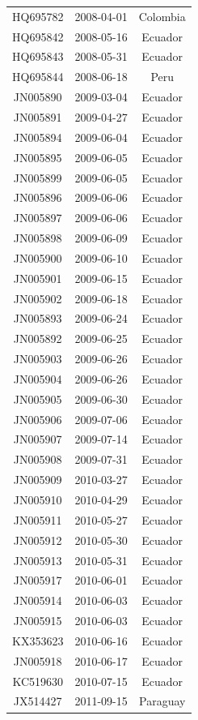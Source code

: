 \documentclass[a4paper,10pt]{article}
\begin{document}
\begin{center}
\begin{longtable}{ccc}
HQ695782 & 2008-04-01 & Colombia \\
HQ695842 & 2008-05-16 & Ecuador \\
HQ695843 & 2008-05-31 & Ecuador \\
HQ695844 & 2008-06-18 & Peru \\
JN005890 & 2009-03-04 & Ecuador \\
JN005891 & 2009-04-27 & Ecuador \\
JN005894 & 2009-06-04 & Ecuador \\
JN005895 & 2009-06-05 & Ecuador \\
JN005899 & 2009-06-05 & Ecuador \\
JN005896 & 2009-06-06 & Ecuador \\
JN005897 & 2009-06-06 & Ecuador \\
JN005898 & 2009-06-09 & Ecuador \\
JN005900 & 2009-06-10 & Ecuador \\
JN005901 & 2009-06-15 & Ecuador \\
JN005902 & 2009-06-18 & Ecuador \\
JN005893 & 2009-06-24 & Ecuador \\
JN005892 & 2009-06-25 & Ecuador \\
JN005903 & 2009-06-26 & Ecuador \\
JN005904 & 2009-06-26 & Ecuador \\
JN005905 & 2009-06-30 & Ecuador \\
JN005906 & 2009-07-06 & Ecuador \\
JN005907 & 2009-07-14 & Ecuador \\
JN005908 & 2009-07-31 & Ecuador \\
JN005909 & 2010-03-27 & Ecuador \\
JN005910 & 2010-04-29 & Ecuador \\
JN005911 & 2010-05-27 & Ecuador \\
JN005912 & 2010-05-30 & Ecuador \\
JN005913 & 2010-05-31 & Ecuador \\
JN005917 & 2010-06-01 & Ecuador \\
JN005914 & 2010-06-03 & Ecuador \\
JN005915 & 2010-06-03 & Ecuador \\
KX353623 & 2010-06-16 & Ecuador \\
JN005918 & 2010-06-17 & Ecuador \\
KC519630 & 2010-07-15 & Ecuador \\
JX514427 & 2011-09-15 & Paraguay
 \end{longtable}
\end{center}
\end{document}
